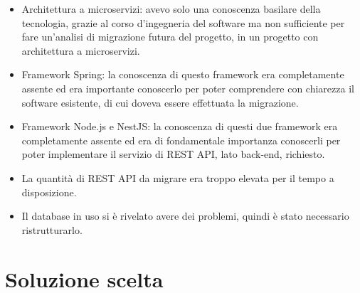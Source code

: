 \begin{itemize}
    \item Architettura a microservizi: avevo solo una conoscenza basilare
          della tecnologia, grazie al corso d'ingegneria del software ma non
          sufficiente per fare un'analisi di migrazione futura del progetto, in un progetto con 
          architettura a microservizi. %
    \item Framework Spring: la conoscenza di questo framework era completamente assente
        ed era importante conoscerlo per poter comprendere con chiarezza il software esistente,
        di cui doveva essere effettuata la migrazione.
    \item Framework Node.js e NestJS: la conoscenza di questi due framework era completamente
        assente ed era di fondamentale importanza conoscerli per poter implementare il servizio
        di REST API, lato back-end, richiesto.
    \item La quantità di REST API da migrare era troppo elevata per il tempo a disposizione.
    \item Il database in uso si è rivelato avere dei problemi, quindi è stato necessario ristrutturarlo.
\end{itemize}

\section{Soluzione scelta}

